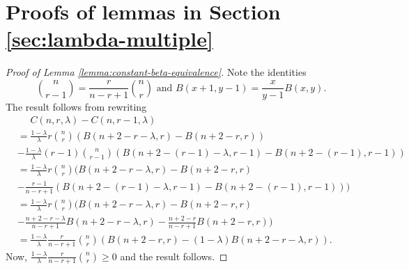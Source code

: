 \documentclass[11pt]{article}
\newcommand{\equalSpace}{\quad\,\,}
\begin{document}
\section{Proofs of lemmas in Section \ref{sec:lambda-multiple}}
\label{appendix:order-statistic-policy}


\begin{proof}[Proof of Lemma \ref{lemma:constant-beta-equivalence}]
    Note the identities 
    $$
    \binom{n}{r-1}=\frac{r}{n-r+1}\binom{n}{r}\text{ and }B(x+1,y-1)=\frac{x}{y-1}B(x,y).
    $$
    The result follows from rewriting
    \begin{align*}
        &\equalSpace C(n,r,\lambda)-C(n,r-1,\lambda)\\&=\frac{1-\lambda}{\lambda}r\binom{n}{r}(B(n+2-r-\lambda,r)-B(n+2-r,r))\\
        &-\frac{1-\lambda}{\lambda}(r-1)\binom{n}{r-1}(B(n+2-(r-1)-\lambda,r-1)-B(n+2-(r-1),r-1))\\
        &=\frac{1-\lambda}{\lambda}r\binom{n}{r}\Big(B(n+2-r-\lambda,r)-B(n+2-r,r)\\
        &-\frac{r-1}{n-r+1}(B(n+2-(r-1)-\lambda,r-1)-B(n+2-(r-1),r-1))\Big)\\
        &=\frac{1-\lambda}{\lambda}r\binom{n}{r}\Big(B(n+2-r-\lambda,r)-B(n+2-r,r)\\
        &-\frac{n+2-r-\lambda}{n-r+1}B(n+2-r-\lambda,r)-\frac{n+2-r}{n-r+1}B(n+2-r,r)\Big)\\
        &=\frac{1-\lambda}{\lambda}\frac{r}{n-r+1}\binom{n}{r}(B(n+2-r,r)-(1-\lambda)B(n+2-r-\lambda,r)).
    \end{align*}
    Now, $\frac{1-\lambda}{\lambda}\frac{r}{n-r+1}\binom{n}{r}\ge 0$ and the result follows. 
\end{proof}
\bigskip
\end{document}
